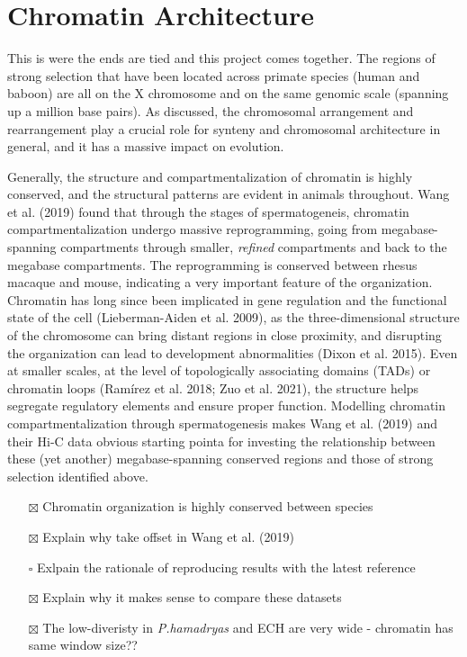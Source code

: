 \documentclass[
  11pt,
  a4paper,
]{scrbook}
\providecommand{\tightlist}{%
  \setlength{\itemsep}{0pt}\setlength{\parskip}{0pt}}\usepackage{longtable,booktabs,array}
\let\oldemph\emph
\renewcommand\emph[1]{\oldemph{\color{gray}#1}}
\begin{document}
\section{Chromatin Architecture}\label{chromatin-architecture}

This is were the ends are tied and this project comes together. The
regions of strong selection that have been located across primate
species (human and baboon) are all on the X chromosome and on the same
genomic scale (spanning up a million base pairs). As discussed, the
chromosomal arrangement and rearrangement play a crucial role for
synteny and chromosomal architecture in general, and it has a massive
impact on evolution.

Generally, the structure and compartmentalization of chromatin is highly
conserved, and the structural patterns are evident in animals
throughout. Wang et al. (2019) found that through the stages of
spermatogeneis, chromatin compartmentalization undergo massive
reprogramming, going from megabase-spanning compartments through
smaller, \emph{refined} compartments and back to the megabase
compartments. The reprogramming is conserved between rhesus macaque and
mouse, indicating a very important feature of the organization.
Chromatin has long since been implicated in gene regulation and the
functional state of the cell (Lieberman-Aiden et al. 2009), as the
three-dimensional structure of the chromosome can bring distant regions
in close proximity, and disrupting the organization can lead to
development abnormalities (Dixon et al. 2015). Even at smaller scales,
at the level of topologically associating domains (TADs) or chromatin
loops (Ramírez et al. 2018; Zuo et al. 2021), the structure helps
segregate regulatory elements and ensure proper function. Modelling
chromatin compartmentalization through spermatogenesis makes Wang et al.
(2019) and their Hi-C data obvious starting pointa for investing the
relationship between these (yet another) megabase-spanning conserved
regions and those of strong selection identified above.

\begin{itemize}
\tightlist
\item[$\boxtimes$]
  Chromatin organization is highly conserved between species
\item[$\boxtimes$]
  Explain why take offset in Wang et al. (2019)
\item[$\square$]
  Exlpain the rationale of reproducing results with the latest reference
\item[$\boxtimes$]
  Explain why it makes sense to compare these datasets
\item[$\boxtimes$]
  The low-diveristy in \emph{P.hamadryas} and ECH are very wide -
  chromatin has same window size??
\end{itemize}
\end{document}
